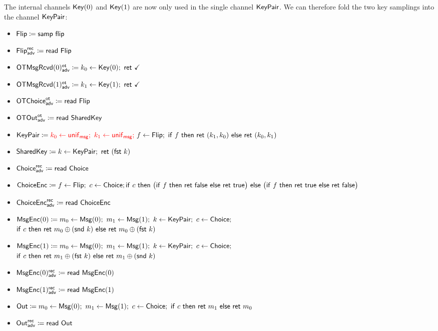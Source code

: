 \noindent The internal channels $\mathsf{Key}(0)$ and $\mathsf{Key}(1)$ are now only used in the single channel $\mathsf{KeyPair}$. We can therefore fold the two key samplings into the channel $\mathsf{KeyPair}$:

\begin{itemize}
\item $\mathsf{Flip} \coloneqq \mathsf{samp} \ \mathsf{flip}$
\item {\color{blue} $\mathsf{Flip}^{\mathsf{rec}}_{\mathsf{adv}} \coloneqq \mathsf{read} \ \mathsf{Flip}$}
\item {\color{blue} $\LeakOTMsgRcvd(0)^\ot_\adv \coloneqq k_0 \leftarrow \Key(0); \ \ret{\checkmark}$}
\item {\color{blue} $\LeakOTMsgRcvd(1)^\ot_\adv \coloneqq k_1 \leftarrow \Key(1); \ \ret{\checkmark}$}
\item {\color{blue} $\mathsf{OTChoice}^{\mathsf{ot}}_{\mathsf{adv}} \coloneqq \mathsf{read} \ \mathsf{Flip}$}
\item {\color{blue} $\mathsf{OTOut}^{\mathsf{ot}}_{\mathsf{adv}} \coloneqq \mathsf{read} \ \mathsf{SharedKey}$}
\item $\mathsf{KeyPair} \coloneqq {\color{red} k_0 \leftarrow \mathsf{unif}_{\mathsf{msg}}; \ k_1 \leftarrow \mathsf{unif}_{\mathsf{msg}}; \ } f \leftarrow \mathsf{Flip}; \ \mathsf{if} \ f \ \mathsf{then} \ \mathsf{ret} \ (k_1,k_0) \ \mathsf{else} \ \mathsf{ret} \ (k_0,k_1)$
\item $\mathsf{SharedKey} \coloneqq k \leftarrow \mathsf{KeyPair}; \ \mathsf{ret} \ (\mathsf{fst} \ k)$
\item {\color{blue} $\mathsf{Choice}^{\mathsf{rec}}_{\mathsf{adv}} \coloneqq \mathsf{read} \ \mathsf{Choice}$}
\item $\mathsf{ChoiceEnc} \coloneqq f \leftarrow \mathsf{Flip}; \ c \leftarrow \mathsf{Choice}; \\ \mathsf{if} \ c \ \mathsf{then} \ \big(\mathsf{if} \ f \ \mathsf{then} \ \mathsf{ret} \ \mathsf{false} \ \mathsf{else} \ \mathsf{ret} \ \mathsf{true}\big) \ \mathsf{else} \ \big(\mathsf{if} \ f \ \mathsf{then} \ \mathsf{ret} \ \mathsf{true} \ \mathsf{else} \ \mathsf{ret} \ \mathsf{false}\big)$
\item {\color{blue} $\mathsf{ChoiceEnc}^{\mathsf{rec}}_{\mathsf{adv}} \coloneqq \mathsf{read} \ \mathsf{ChoiceEnc}$}
\item $\mathsf{MsgEnc}(0) \coloneqq m_0 \leftarrow \mathsf{Msg}(0); \ m_1 \leftarrow \mathsf{Msg}(1); \ k \leftarrow \mathsf{KeyPair}; \ c \leftarrow \mathsf{Choice};$ \\ $\ifte{c}{\ret{m_0 \oplus (\snd \ k)}}{\ret{m_0 \oplus (\fst \ k)}}$
\item $\mathsf{MsgEnc}(1) \coloneqq m_0 \leftarrow \mathsf{Msg}(0); \ m_1 \leftarrow \mathsf{Msg}(1); \ k \leftarrow \mathsf{KeyPair}; \ c \leftarrow \mathsf{Choice};$ \\ $\ifte{c}{\ret{m_1 \oplus (\fst \ k)}}{\ret{m_1 \oplus (\snd \ k)}}$
\item {\color{blue} $\mathsf{MsgEnc}(0)^{\mathsf{rec}}_{\mathsf{adv}} \coloneqq \mathsf{read} \ \mathsf{MsgEnc}(0)$}
\item {\color{blue} $\mathsf{MsgEnc}(1)^{\mathsf{rec}}_{\mathsf{adv}} \coloneqq \mathsf{read} \ \mathsf{MsgEnc}(1)$}
\item $\Out \coloneqq m_0 \leftarrow \Msg(0); \ m_1 \leftarrow \Msg(1); \ c \leftarrow \Choice; \ \ifte{c}{\ret{m_1}}{\ret{m_0}}$
\item {\color{blue} $\mathsf{Out}^{\mathsf{rec}}_{\mathsf{adv}} \coloneqq \mathsf{read} \ \mathsf{Out}$}
\end{itemize}

